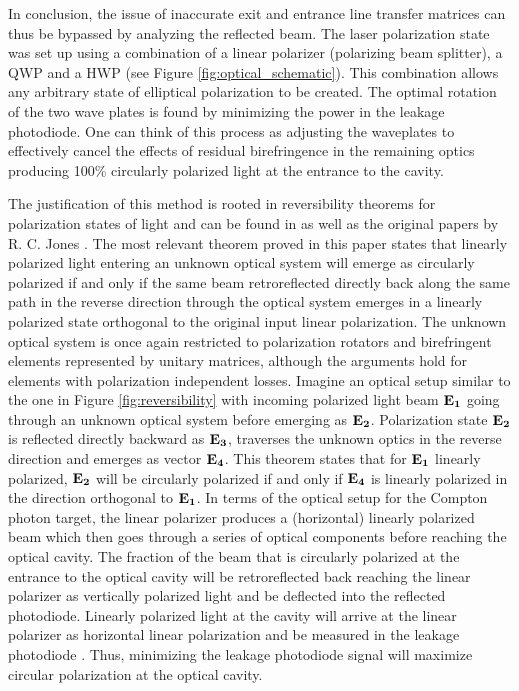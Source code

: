 In conclusion, the issue of inaccurate exit and entrance line transfer matrices can thus be bypassed by analyzing the reflected beam. The laser polarization state was set up using a combination of a linear polarizer (polarizing beam splitter), a QWP and a HWP (see Figure \ref{fig:optical_schematic}). This combination allows any arbitrary state of elliptical polarization to be created. The optimal rotation of the two wave plates is found by minimizing the power in the leakage photodiode. One can think of this process as adjusting the waveplates to effectively cancel the effects of residual birefringence in the remaining optics producing 100\% circularly polarized light at the entrance to the cavity.

The justification of this method is rooted in reversibility theorems for polarization states of light and can be found in \cite{Vansteenkiste} as well as the original papers by R. C. Jones \cite{Jones1}\cite{Jones2}. The most relevant theorem proved in this paper\cite{Vansteenkiste} states that linearly polarized light entering an unknown optical system will emerge as circularly polarized if and only if the same beam retroreflected directly back along the same path in the reverse direction through the optical system emerges in a linearly polarized state orthogonal to the original input linear polarization. The unknown optical system is once again restricted to polarization rotators and birefringent elements represented by unitary matrices, although the arguments hold for elements with polarization independent losses. Imagine an optical setup similar to the one in Figure \ref{fig:reversibility} with incoming polarized light beam ${\bf E_1}$ going through an unknown optical system before emerging as ${\bf E_2}$. Polarization state ${\bf E_2}$ is reflected directly backward as ${\bf E_3}$, traverses the unknown optics in the reverse direction and emerges as vector ${\bf E_4}$. This theorem states that for ${\bf E_1}$ linearly polarized, ${\bf E_2}$ will be circularly polarized if and only if ${\bf E_4}$ is linearly polarized in the direction orthogonal to ${\bf E_1}$. In terms of the optical setup for the Compton photon target, the linear polarizer produces a (horizontal) linearly polarized beam which then goes through a series of optical components before reaching the optical cavity. The fraction of the beam that is circularly polarized at the entrance to the optical cavity will be retroreflected back reaching the linear polarizer as vertically polarized light and be deflected into the reflected photodiode. Linearly polarized light at the cavity will arrive at the linear polarizer as horizontal linear polarization and be measured in the leakage photodiode . Thus, minimizing the leakage photodiode signal will maximize circular polarization at the optical cavity.

